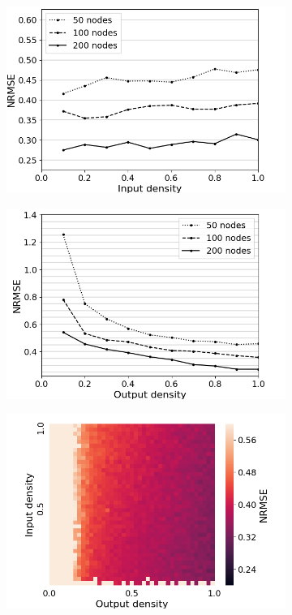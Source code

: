 \begin{figure}[htbp]
  \centering
  \begin{subfigure}{.3\textwidth}
    \centering
    \includegraphics[width=\linewidth]{img/input_density_all.png}
  \end{subfigure}
  \begin{subfigure}{.3\textwidth}
    \centering
    \includegraphics[width=\linewidth]{img/output_density_all.png}
  \end{subfigure}
  \begin{subfigure}{.3\textwidth}
    \centering
    \includegraphics[width=\linewidth]{img/partial_visibility.png}

\end{subfigure}
\end{figure}
